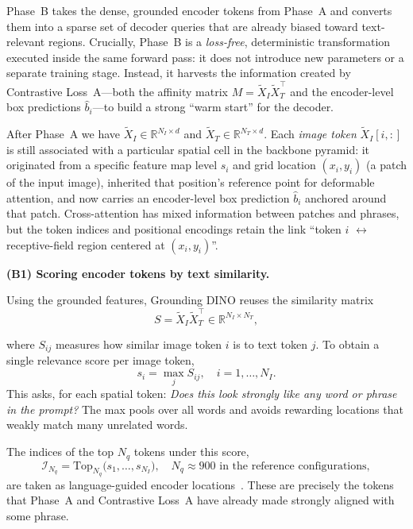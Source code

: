 \begin{enrichment}
\begin{enrichment}[Method][subsection]
		Phase~B takes the dense, grounded encoder tokens from Phase~A and converts them into a sparse set of decoder queries that are already biased toward text-relevant regions. Crucially, Phase~B is a \emph{loss-free}, deterministic transformation executed inside the same forward pass: it does not introduce new parameters or a separate training stage. Instead, it harvests the information created by Contrastive Loss~A---both the affinity matrix \(M = \tilde{X}_I \tilde{X}_T^\top\) and the encoder-level box predictions \(\hat{b}_i\)---to build a strong ``warm start'' for the decoder.
		
		After Phase~A we have \(\tilde{X}_I \in \mathbb{R}^{N_I \times d}\) and \(\tilde{X}_T \in \mathbb{R}^{N_T \times d}\). Each \emph{image token} \(\tilde{X}_I[i,:]\) is still associated with a particular spatial cell in the backbone pyramid: it originated from a specific feature map level \(s_i\) and grid location \((x_i,y_i)\) (a patch of the input image), inherited that position’s reference point for deformable attention, and now carries an encoder-level box prediction \(\hat{b}_i\) anchored around that patch. Cross-attention has mixed information between patches and phrases, but the token indices and positional encodings retain the link ``token \(i\) \(\leftrightarrow\) receptive-field region centered at \((x_i,y_i)\)''.
		
		\medskip
		
		\noindent\textbf{(B1) Scoring encoder tokens by text similarity.}
		
		Using the grounded features, Grounding DINO reuses the similarity matrix
		\begin{equation}
			S = \tilde{X}_I \tilde{X}_T^\top \in \mathbb{R}^{N_I \times N_T},
		\end{equation}
		
		where \(S_{ij}\) measures how similar image token \(i\) is to text token \(j\). To obtain a single relevance score per image token,
		\begin{equation}
			s_i = \max_j S_{ij}, \quad i = 1,\dots,N_I.
		\end{equation}
		This asks, for each spatial token: \emph{Does this look strongly like any word or phrase in the prompt?} The max pools over all words and avoids rewarding locations that weakly match many unrelated words.
		
		The indices of the top \(N_q\) tokens under this score,
		\begin{equation}
			\mathcal{I}_{N_q} = \mathrm{Top}_{N_q}\bigl(s_1,\dots,s_{N_I}\bigr),
			\quad N_q \approx 900 \text{ in the reference configurations},
		\end{equation}
		are taken as language-guided encoder locations~\cite{liu2023_groundingdino}. These are precisely the tokens that Phase~A and Contrastive Loss~A have already made strongly aligned with some phrase.
		

\end{enrichment}
\end{enrichment}

